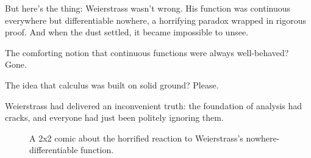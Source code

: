 But here’s the thing: Weierstrass wasn’t wrong. His function was continuous everywhere but differentiable nowhere, a horrifying paradox wrapped in rigorous proof. And when the dust settled, it became impossible to unsee.  

The comforting notion that continuous functions were always well-behaved? Gone.  

The idea that calculus was built on solid ground? Please.  

Weierstrass had delivered an inconvenient truth: the foundation of analysis had cracks, and everyone had just been politely ignoring them.  



\begin{figure}[H]
\centering
{}
\caption{A 2x2 comic about the horrified reaction to Weierstrass’s nowhere-differentiable function.}
\end{figure}
